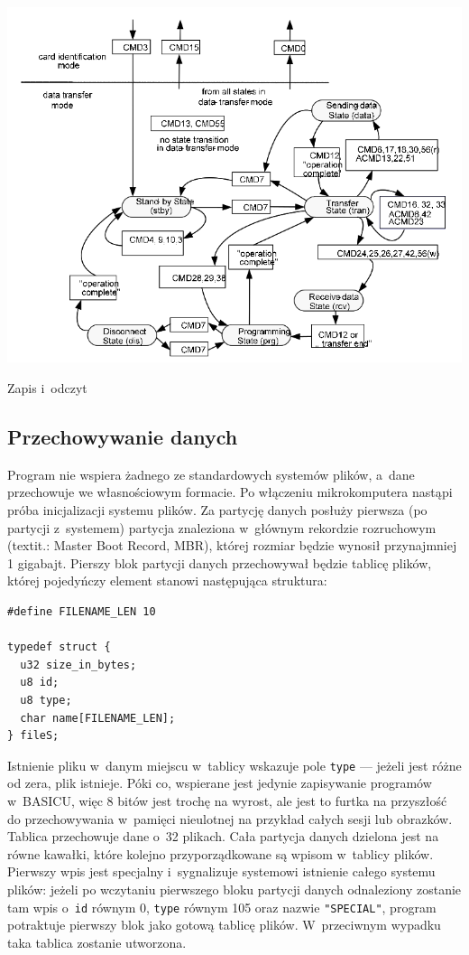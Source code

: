 \documentclass[shortabstract]{iithesis}
\begin{document}
\begingroup
\centering
\includegraphics[width=\textwidth]{sd-transfer.png}
\captionsetup{type=figure}
\caption{Zapis i~odczyt}
\endgroup

\subsection{Przechowywanie danych}
Program nie wspiera żadnego ze standardowych systemów plików, a~dane przechowuje we własnościowym formacie. Po włączeniu mikrokomputera nastąpi próba inicjalizacji systemu plików. Za partycję danych posłuży pierwsza (po partycji z~systemem) partycja znaleziona w~głównym rekordzie rozruchowym (textit{.: Master Boot Record, MBR}), której rozmiar będzie wynosił przynajmniej 1 gigabajt. Pierszy blok partycji danych przechowywał będzie tablicę plików, której pojedyńczy element stanowi następująca struktura:
\begin{verbatim}
#define FILENAME_LEN 10

typedef struct {
  u32 size_in_bytes;
  u8 id;
  u8 type;
  char name[FILENAME_LEN];
} fileS;
\end{verbatim}

Istnienie pliku w~danym miejscu w~tablicy wskazuje pole \texttt{type} --- jeżeli jest różne od zera, plik istnieje. Póki co, wspierane jest jedynie zapisywanie programów w~BASICU, więc 8 bitów jest trochę na wyrost, ale jest to furtka na przyszłość do przechowywania w~pamięci nieulotnej na przykład całych sesji lub obrazków. Tablica przechowuje dane o~32 plikach. Cała partycja danych dzielona jest na równe kawałki, które kolejno przyporządkowane są wpisom w~tablicy plików. Pierwszy wpis jest specjalny i~sygnalizuje systemowi istnienie całego systemu plików: jeżeli po wczytaniu pierwszego bloku partycji danych odnaleziony zostanie tam wpis o~\texttt{id} równym 0, \texttt{type} równym 105 oraz nazwie \texttt{"SPECIAL"}, program potraktuje pierwszy blok jako gotową tablicę plików. W~przeciwnym wypadku taka tablica zostanie utworzona.
\end{document}
